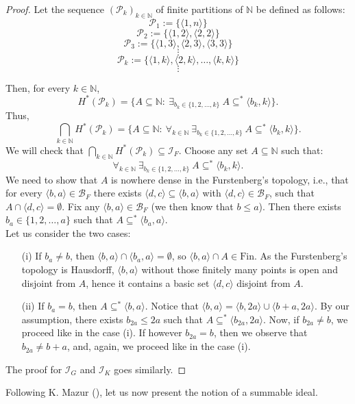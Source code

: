 \documentclass{amsart}
\theoremstyle{definition}
\newcommand{\N}{{\mathbb N}}
\newcommand{\Fin}{\textrm{Fin}}
\newcommand{\I}{\mathcal I}
\newcommand{\B}{\mathcal{B}}
\newcommand{\arithseq}[2]{\langle#2, #1\rangle}
\begin{document}
\begin{proof}
Let the sequence $(\mathcal{P}_k)_{k\in\N}$ of finite partitions of $\N$ be defined as follows:
$$\mathcal{P}_1 := \{\arithseq{n}{1}\}$$
$$\mathcal{P}_2 := \{\arithseq{2}{1}, \arithseq{2}{2}\}$$
$$\mathcal{P}_3 := \{\arithseq{3}{1}, \arithseq{3}{2}, \arithseq{3}{3}\}$$
$$\vdots$$
$$\mathcal{P}_k := \{\arithseq{k}{1}, \arithseq{k}{2}, \ldots, \arithseq{k}{k}\}$$
$$\vdots$$

Then, for every $k\in\N$, 
$$H^{*}(\mathcal{P}_k)= \{A\subseteq\N :\ \exists_{b_k\in\{1,2,\ldots,k\}}\ A\subseteq^* \arithseq{k}{b_k}\}.$$
Thus,
$$\bigcap_{k\in\N}{H^{*}(\mathcal{P}_k)}= \{A\subseteq\N :\ \forall_{k\in\N}\ \exists_{b_k\in\{1,2,\ldots,k\}}\ A\subseteq^* \arithseq{k}{b_k}\}.$$
We will check that $\bigcap_{k\in\N}{H^{*}(\mathcal{P}_k)}\subseteq\I_F$. Choose any set $A\subseteq\N$ such that: 
$$\forall_{k\in\N}\ \exists_{b_k\in\{1,2,\ldots,k\}}\ A\subseteq^* \arithseq{k}{b_k}.$$ 
We need to show that $A$ is nowhere dense in the Furstenberg's topology, i.e., that for every $\arithseq{a}{b}\in \B_F$ there exists $\arithseq{c}{d}\subseteq \arithseq{a}{b}$ with $\arithseq{c}{d}\in \B_F$, such that $A\cap \arithseq{c}{d} = \emptyset$. Fix any $\arithseq{a}{b}\in \B_F$ (we then know that $b\leq a$). Then there exists $b_a\in\{1,2,\ldots,a\}$ such that $A\subseteq^* \arithseq{a}{b_a}$.\\ 
Let us consider the two cases:
\begin{itemize}
	\item[(i)] If $b_a\neq b$, then $\arithseq{a}{b} \cap \arithseq{a}{b_a} = \emptyset$, so $\arithseq{a}{b}\cap A \in\Fin$. 
	As the Furstenberg's topology is Hausdorff, $\arithseq{a}{b}$ without those finitely many points is open and disjoint from $A$, hence it contains a basic set $\arithseq{c}{d}$ disjoint from $A$. 
	\item[(ii)] If $b_a = b$, then $A\subseteq^* \arithseq{a}{b}$. Notice that $\arithseq{a}{b}=\arithseq{2a}{b}\cup \arithseq{2a}{b + a}$. 
By our assumption, there exists $b_{2a}\leq 2a$ such that $A\subseteq^* \arithseq{2a}{b_{2a}}$. Now, if $b_{2a} \neq b$, we proceed like in the case (i). If however $b_{2a}=b$, then we observe that $b_{2a}\neq b+a$, and, again, we proceed like in the case (i).
\end{itemize}

The proof for $\I_G$ and $\I_K$ goes similarly.
\end{proof}


Following K. Mazur (\cite{Maz}), let us now present the notion of a summable ideal.
\end{document}
